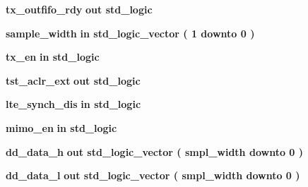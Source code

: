 \begin{DoxyCompactItemize}
{\bf tx\+\_\+outfifo\+\_\+rdy}  {\bfseries {\bfseries \textcolor{keywordflow}{out}\textcolor{vhdlchar}{ }}} {\bfseries \textcolor{comment}{std\+\_\+logic}\textcolor{vhdlchar}{ }} 
\item 
{\bf sample\+\_\+width}  {\bfseries {\bfseries \textcolor{keywordflow}{in}\textcolor{vhdlchar}{ }}} {\bfseries \textcolor{comment}{std\+\_\+logic\+\_\+vector}\textcolor{vhdlchar}{ }\textcolor{vhdlchar}{(}\textcolor{vhdlchar}{ }\textcolor{vhdlchar}{ } \textcolor{vhdldigit}{1} \textcolor{vhdlchar}{ }\textcolor{keywordflow}{downto}\textcolor{vhdlchar}{ }\textcolor{vhdlchar}{ } \textcolor{vhdldigit}{0} \textcolor{vhdlchar}{ }\textcolor{vhdlchar}{)}\textcolor{vhdlchar}{ }} 
\item 
{\bf tx\+\_\+en}  {\bfseries {\bfseries \textcolor{keywordflow}{in}\textcolor{vhdlchar}{ }}} {\bfseries \textcolor{comment}{std\+\_\+logic}\textcolor{vhdlchar}{ }} 
\item 
{\bf tst\+\_\+aclr\+\_\+ext}  {\bfseries {\bfseries \textcolor{keywordflow}{out}\textcolor{vhdlchar}{ }}} {\bfseries \textcolor{comment}{std\+\_\+logic}\textcolor{vhdlchar}{ }} 
\item 
{\bf lte\+\_\+synch\+\_\+dis}  {\bfseries {\bfseries \textcolor{keywordflow}{in}\textcolor{vhdlchar}{ }}} {\bfseries \textcolor{comment}{std\+\_\+logic}\textcolor{vhdlchar}{ }} 
\item 
{\bf mimo\+\_\+en}  {\bfseries {\bfseries \textcolor{keywordflow}{in}\textcolor{vhdlchar}{ }}} {\bfseries \textcolor{comment}{std\+\_\+logic}\textcolor{vhdlchar}{ }} 
\item 
{\bf dd\+\_\+data\+\_\+h}  {\bfseries {\bfseries \textcolor{keywordflow}{out}\textcolor{vhdlchar}{ }}} {\bfseries \textcolor{comment}{std\+\_\+logic\+\_\+vector}\textcolor{vhdlchar}{ }\textcolor{vhdlchar}{(}\textcolor{vhdlchar}{ }\textcolor{vhdlchar}{ }\textcolor{vhdlchar}{ }\textcolor{vhdlchar}{ }{\bfseries {\bf smpl\+\_\+width}} \textcolor{vhdlchar}{ }\textcolor{keywordflow}{downto}\textcolor{vhdlchar}{ }\textcolor{vhdlchar}{ } \textcolor{vhdldigit}{0} \textcolor{vhdlchar}{ }\textcolor{vhdlchar}{)}\textcolor{vhdlchar}{ }} 
\item 
{\bf dd\+\_\+data\+\_\+l}  {\bfseries {\bfseries \textcolor{keywordflow}{out}\textcolor{vhdlchar}{ }}} {\bfseries \textcolor{comment}{std\+\_\+logic\+\_\+vector}\textcolor{vhdlchar}{ }\textcolor{vhdlchar}{(}\textcolor{vhdlchar}{ }\textcolor{vhdlchar}{ }\textcolor{vhdlchar}{ }\textcolor{vhdlchar}{ }{\bfseries {\bf smpl\+\_\+width}} \textcolor{vhdlchar}{ }\textcolor{keywordflow}{downto}\textcolor{vhdlchar}{ }\textcolor{vhdlchar}{ } \textcolor{vhdldigit}{0} \textcolor{vhdlchar}{ }\textcolor{vhdlchar}{)}\textcolor{vhdlchar}{ }} 

\end{DoxyCompactItemize}
